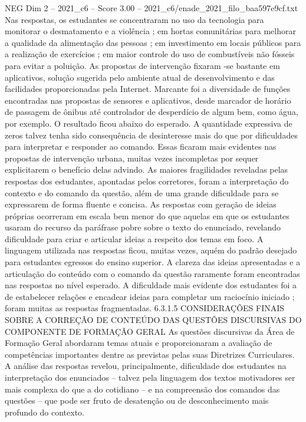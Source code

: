 \begin{textsample}{NEG Dim 2 – 2021\_c6 – Score 3.00 – 2021\_c6/enade\_2021\_filo\_baa597e9cf.txt}
Nas respostas, os estudantes se concentraram no uso da tecnologia para monitorar o desmatamento e a violência ; em hortas comunitárias para melhorar a qualidade da alimentação das pessoas ; em investimento em locais públicos para a realização de exercícios ; em maior controle do uso de combustíveis não fósseis para evitar a poluição.
As propostas de intervenção fixaram -se bastante em aplicativos, solução sugerida pelo ambiente atual de desenvolvimento e das facilidades proporcionadas pela Internet.
Marcante foi a diversidade de funções encontradas nas propostas de sensores e aplicativos, desde marcador de horário de passagem de ônibus até controlador de desperdício de algum bem, como água, por exemplo.
O resultado ficou abaixo do esperado.
A quantidade expressiva de zeros talvez tenha sido consequência de desinteresse mais do que por dificuldades para interpretar e responder ao comando.
Essas ficaram mais evidentes nas propostas de intervenção urbana, muitas vezes incompletas por sequer explicitarem o benefício delas advindo.
As maiores fragilidades reveladas pelas respostas dos estudantes, apontadas pelos corretores, foram a interpretação do contexto e do comando da questão, além de uma grande dificuldade para se expressarem de forma fluente e concisa.
As respostas com geração de ideias próprias ocorreram em escala bem menor do que aquelas em que os estudantes usaram do recurso da paráfrase pobre sobre o texto do enunciado, revelando dificuldade para criar e articular ideias a respeito dos temas em foco.
A linguagem utilizada nas respostas ficou, muitas vezes, aquém do padrão desejado para estudantes egressos do ensino superior.
A clareza das ideias apresentadas e a articulação do conteúdo com o comando da questão raramente foram encontradas nas respostas no nível esperado.
A dificuldade mais evidente dos estudantes foi a de estabelecer relações e encadear ideias para completar um raciocínio iniciado ; foram muitas as respostas fragmentadas. 6.3.1.5 CONSIDERAÇÕES FINAIS SOBRE A CORREÇÃO DE CONTEÚDO DAS QUESTÕES DISCURSIVAS DO COMPONENTE DE FORMAÇÃO GERAL As questões discursivas da Área de Formação Geral abordaram temas atuais e proporcionaram a avaliação de competências importantes dentre as previstas pelas suas Diretrizes Curriculares.
A análise das respostas revelou, principalmente, dificuldade dos estudantes na interpretação dos enunciados – talvez pela linguagem dos textos motivadores ser mais complexa do que a do cotidiano – e na compreensão dos comandos das questões – que pode ser fruto de desatenção ou de desconhecimento mais profundo do contexto.

\end{textsample}
